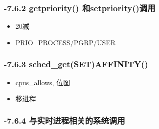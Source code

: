 \documentclass[11pt]{article}
\begin{document}
\subsubsection{-7.6.2 getpriority() 和setpriority()调用}
\label{sec-2.6.2}

\begin{itemize}
\item 20减
\item PRIO\_PROCESS/PGRP/USER
\end{itemize}
\subsubsection{-7.6.3 sched\_get(SET)AFFINITY()}
\label{sec-2.6.3}

\begin{itemize}
\item cpus\_allows, 位图
\item 移进程
\end{itemize}
\subsubsection{-7.6.4 与实时进程相关的系统调用}
\label{sec-2.6.4}
\end{document}

